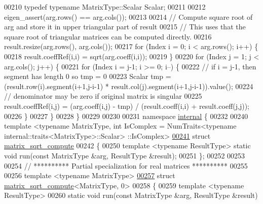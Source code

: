 \begin{DoxyCode}
00210       \textcolor{keyword}{typedef} \textcolor{keyword}{typename} MatrixType::Scalar Scalar;
00211 
00212   eigen\_assert(arg.rows() == arg.cols());
00213 
00214   \textcolor{comment}{// Compute square root of arg and store it in upper triangular part of result}
00215   \textcolor{comment}{// This uses that the square root of triangular matrices can be computed directly.}
00216   result.resize(arg.rows(), arg.cols());
00217   \textcolor{keywordflow}{for} (Index i = 0; i < arg.rows(); i++) \{
00218     result.coeffRef(i,i) = sqrt(arg.coeff(i,i));
00219   \}
00220   \textcolor{keywordflow}{for} (Index j = 1; j < arg.cols(); j++) \{
00221     \textcolor{keywordflow}{for} (Index i = j-1; i >= 0; i--) \{
00222       \textcolor{comment}{// if i = j-1, then segment has length 0 so tmp = 0}
00223       Scalar tmp = (result.row(i).segment(i+1,j-i-1) * result.col(j).segment(i+1,j-i-1)).value();
00224       \textcolor{comment}{// denominator may be zero if original matrix is singular}
00225       result.coeffRef(i,j) = (arg.coeff(i,j) - tmp) / (result.coeff(i,i) + result.coeff(j,j));
00226     \}
00227   \}
00228 \}
00229 
00230 
00231 \textcolor{keyword}{namespace }\hyperlink{namespaceinternal}{internal} \{
00232 
00240 template <typename MatrixType, int IsComplex = NumTraits<typename internal::traits<MatrixType>::Scalar>
      ::IsComplex>
\hyperlink{struct_eigen_1_1internal_1_1matrix__sqrt__compute}{00241} \textcolor{keyword}{struct }\hyperlink{struct_eigen_1_1internal_1_1matrix__sqrt__compute}{matrix\_sqrt\_compute}
00242 \{
00250   \textcolor{keyword}{template} <\textcolor{keyword}{typename} ResultType> \textcolor{keyword}{static} \textcolor{keywordtype}{void} run(\textcolor{keyword}{const} MatrixType &arg, ResultType &result);    
00251 \};
00252 
00253 
00254 \textcolor{comment}{// ********** Partial specialization for real matrices **********}
00255 
00256 \textcolor{keyword}{template} <\textcolor{keyword}{typename} MatrixType>
\hyperlink{struct_eigen_1_1internal_1_1matrix__sqrt__compute_3_01_matrix_type_00_010_01_4}{00257} \textcolor{keyword}{struct }\hyperlink{struct_eigen_1_1internal_1_1matrix__sqrt__compute}{matrix\_sqrt\_compute}<MatrixType, 0>
00258 \{
00259   \textcolor{keyword}{template} <\textcolor{keyword}{typename} ResultType>
00260   \textcolor{keyword}{static} \textcolor{keywordtype}{void} run(\textcolor{keyword}{const} MatrixType &arg, ResultType &result)

\end{DoxyCode}
